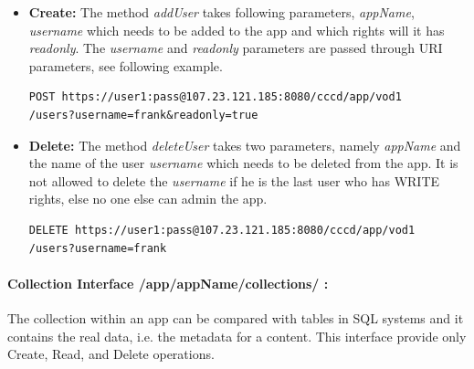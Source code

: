 \begin{itemize}
\item \textbf{Create:} The method \textit{addUser} takes following parameters, \textit{appName}, \textit{username} which needs to be added to the app and which rights will it has \textit{readonly}. The \textit{username} and \textit{readonly} parameters are passed through \ac{URI} parameters, see following example.

\begin{code}
\begin{verbatim}
POST https://user1:pass@107.23.121.185:8080/cccd/app/vod1
/users?username=frank&readonly=true
\end{verbatim}
\end{code}

\item \textbf{Delete:} The method \textit{deleteUser} takes two parameters, namely \textit{appName} and the name of the user \textit{username} which needs to be deleted from the app. It is not allowed to delete the \textit{username} if he is the last user who has WRITE rights, else no one else can admin the app.

\begin{code}
\begin{verbatim}
DELETE https://user1:pass@107.23.121.185:8080/cccd/app/vod1
/users?username=frank
\end{verbatim}
\end{code}

\end{itemize}

\paragraph{Collection Interface /app/{appName}/collections/ :} The collection within an app can be compared with tables in SQL systems and it contains the real data, i.e. the metadata for a content. This interface provide only Create, Read, and Delete operations. 


